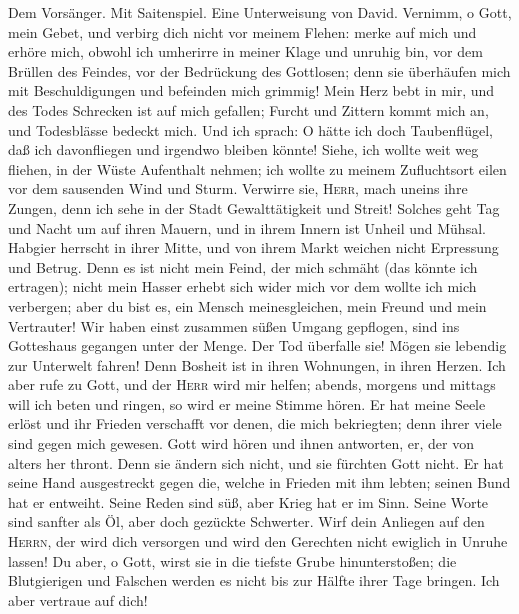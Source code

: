  Dem Vorsänger. Mit Saitenspiel. Eine Unterweisung von
David. Vernimm, o Gott, mein Gebet, und verbirg dich nicht vor meinem
Flehen:  merke auf mich und erhöre mich, obwohl ich
umherirre in meiner Klage und unruhig bin,  vor dem
Brüllen des Feindes, vor der Bedrückung des Gottlosen; denn sie
überhäufen mich mit Beschuldigungen und befeinden mich grimmig!
 Mein Herz bebt in mir, und des Todes Schrecken ist auf
mich gefallen;  Furcht und Zittern kommt mich an, und
Todesblässe bedeckt mich.  Und ich sprach: O hätte ich
doch Taubenflügel, daß ich davonfliegen und irgendwo bleiben könnte!
 Siehe, ich wollte weit weg fliehen, in der Wüste
Aufenthalt nehmen;  ich wollte zu meinem Zufluchtsort
eilen vor dem sausenden Wind und Sturm.  Verwirre sie,
\textsc{Herr}, mach uneins ihre Zungen, denn ich sehe in der Stadt
Gewalttätigkeit und Streit!  Solches geht Tag und Nacht
um auf ihren Mauern, und in ihrem Innern ist Unheil und Mühsal.
 Habgier herrscht in ihrer Mitte, und von ihrem Markt
weichen nicht Erpressung und Betrug.  Denn es ist nicht
mein Feind, der mich schmäht (das könnte ich ertragen); nicht mein
Hasser erhebt sich wider mich vor dem wollte ich mich verbergen;
 aber du bist es, ein Mensch meinesgleichen, mein Freund
und mein Vertrauter!  Wir haben einst zusammen süßen
Umgang gepflogen, sind ins Gotteshaus gegangen unter der Menge.
 Der Tod überfalle sie! Mögen sie lebendig zur Unterwelt
fahren! Denn Bosheit ist in ihren Wohnungen, in ihren Herzen.
 Ich aber rufe zu Gott, und der \textsc{Herr} wird mir
helfen;  abends, morgens und mittags will ich beten und
ringen, so wird er meine Stimme hören.  Er hat meine
Seele erlöst und ihr Frieden verschafft vor denen, die mich bekriegten;
denn ihrer viele sind gegen mich gewesen.  Gott wird
hören und ihnen antworten, er, der von alters her thront. Denn sie
ändern sich nicht, und sie fürchten Gott nicht.  Er hat
seine Hand ausgestreckt gegen die, welche in Frieden mit ihm lebten;
seinen Bund hat er entweiht.  Seine Reden sind süß, aber
Krieg hat er im Sinn. Seine Worte sind sanfter als Öl, aber doch
gezückte Schwerter.  Wirf dein Anliegen auf den
\textsc{Herrn}, der wird dich versorgen und wird den Gerechten nicht
ewiglich in Unruhe lassen!  Du aber, o Gott, wirst sie in
die tiefste Grube hinunterstoßen; die Blutgierigen und Falschen werden
es nicht bis zur Hälfte ihrer Tage bringen. Ich aber vertraue auf dich!


